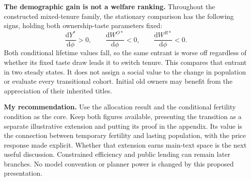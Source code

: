 \documentclass[11pt]{article}
\newcommand{\dd}{\mathrm d}
\begin{document}
\textbf{The demographic gain is not a welfare ranking.}
Throughout the constructed mixed-tenure family, the stationary comparison
has the following signs, holding both ownership-taste parameters fixed:
\begin{equation}
 \frac{\dd Y^*}{\dd\phi}>0,\qquad
 \frac{\dd W^{O*}}{\dd\phi}<0,\qquad
 \frac{\dd W^{R*}}{\dd\phi}<0.
 \label{eq:core_stationary_welfare}
\end{equation}
Both conditional lifetime values fall, so the same entrant is worse off
regardless of whether its fixed taste draw leads it to switch tenure. This
compares that entrant in two steady states. It does not assign a social value
to the change in population or evaluate every transitional cohort. Initial
old owners may benefit from the appreciation of their inherited titles.

\textbf{My recommendation.} Use the allocation result and the conditional
fertility condition as the core. Keep both figures available, presenting the
transition as a separate illustrative extension and putting its proof in the
appendix. Its value is the connection between temporary fertility and lasting
population, with the price response made explicit. Whether that extension
earns main-text space is the next useful discussion. Constrained efficiency
and public lending can remain later branches. No model convention or planner
power is changed by this proposed presentation.
\end{document}
